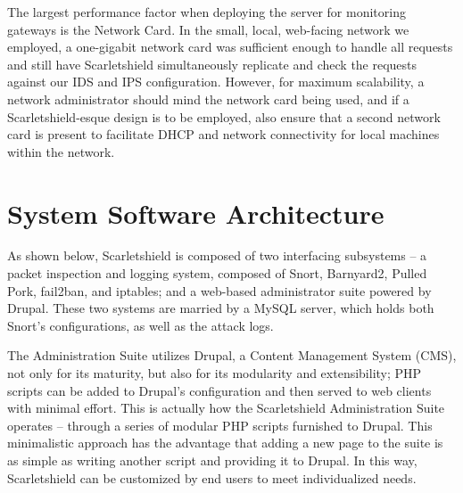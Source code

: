 \documentclass[12pt,letterpaper,titlepage]{report}
\begin{document}
{The largest performance factor when deploying the server for monitoring gateways
is the Network Card.  In the small, local, web-facing
network we employed, a one-gigabit network card was sufficient enough to handle
all requests and still have Scarletshield simultaneously replicate and check the
requests against our IDS and IPS configuration. However, 
for maximum scalability, a network administrator should mind
the network card being used, and if a Scarletshield-esque design is to be employed, 
also ensure that a second network card is present
to facilitate DHCP and network connectivity for local machines within the
network. 


\section{System Software Architecture}

As shown below, Scarletshield is composed of two interfacing subsystems -- 
a packet inspection and logging system, composed of Snort, Barnyard2, Pulled Pork,
fail2ban, and iptables; and a web-based administrator suite powered by Drupal.
These two systems are married by a MySQL server, which holds both Snort's configurations,
as well as the attack logs. 

The Administration Suite utilizes Drupal, a Content Management System (CMS),
not only for its maturity, but also for its modularity and extensibility; 
PHP scripts can be added to Drupal's configuration and then served to web clients
with minimal effort.
This is actually how the Scarletshield Administration Suite operates -- through a
series of modular PHP scripts furnished to Drupal. This minimalistic approach has
the advantage that adding a new page to the suite  is as simple as writing another
script and providing it to Drupal. In this way, Scarletshield can be customized
by end users to meet individualized needs.


}
\end{document}
